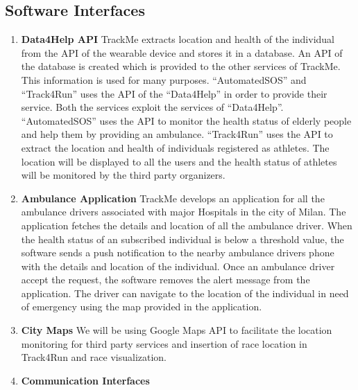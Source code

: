 \subsection{Software Interfaces}
\begin{enumerate}
\item \textbf{Data4Help API}
\newline \qquad TrackMe extracts location and health of the individual from the API of the   wearable device and stores it in a database. An API of the database is created which is provided to the other services of TrackMe. This information is used for many purposes. “AutomatedSOS” and “Track4Run” uses the API of the “Data4Help” in order to provide their service. Both the services exploit the services of “Data4Help”. “AutomatedSOS” uses the API to monitor the health status of elderly people and help them by providing an ambulance. “Track4Run” uses the API to extract the location and health of individuals registered as athletes. The location will be displayed to all the users and the health status of athletes will be monitored by the third party organizers.
\item \textbf{Ambulance Application}
\newline\qquad TrackMe develops an application for all the ambulance drivers associated with major Hospitals in the city of Milan. The application fetches the details and location of all the ambulance driver. When the health status of an subscribed individual is below a threshold value, the software sends a push notification to the nearby ambulance drivers phone with the details and location of the individual. Once an ambulance driver accept the request, the software removes the alert message from the application. The driver can navigate to the location of the individual in need of emergency using the map provided in the application.
\item \textbf{City Maps}
\newline\qquad We will be using Google Maps API to facilitate the location monitoring for third party services and insertion of race location in Track4Run and race visualization.
\item \textbf{Communication Interfaces}
\end{enumerate}
